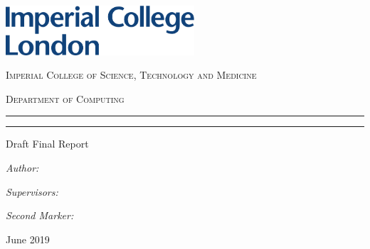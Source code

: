 \begin{titlepage}
	
	\noindent\includegraphics[width=7cm]{./figures/imperial_logo}
	
	\Large\centering
	
	\vspace*{3\baselineskip}	
	\textsc{\LARGE \reporttype}
	
	\vspace*{\baselineskip}	
	\textsc{Imperial College of Science, Technology and Medicine}

	\vspace*{\baselineskip}	
	\textsc{Department of Computing}


	\setlength{\parindent}{0pt}
	
	\setlength{\parskip}{0pt}

	\rule{\linewidth}{0.4pt}\vspace*{\baselineskip}

	{\huge\bfseries\reporttitle}
	\rule{\linewidth}{0.4pt}

	Draft Final Report

	\begin{multicols}{2}
		\begin{flushleft}
			\emph{Author:}
			
			\reportauthor
		\end{flushleft}
		\columnbreak
		\begin{flushright}
			\emph{Supervisors:}
			
			\supervisor	
			\linespace
			\emph{Second Marker:}
			
			\marker
		\end{flushright}			
	\end{multicols}
	
	
	June 2019
	
	
\end{titlepage}
